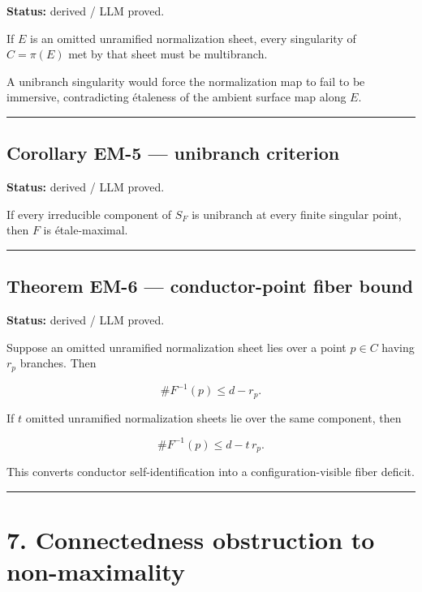 \textbf{Status:} derived / LLM proved.

If \(E\) is an omitted unramified normalization sheet, every singularity
of \(C=\pi(E)\) met by that sheet must be multibranch.

A unibranch singularity would force the normalization map to fail to be
immersive, contradicting étaleness of the ambient surface map along
\(E\).

\begin{center}\rule{0.5\linewidth}{0.5pt}\end{center}

\subsection{Corollary EM-5 --- unibranch
criterion}\label{corollary-em-5-unibranch-criterion}

\textbf{Status:} derived / LLM proved.

If every irreducible component of \(S_F\) is unibranch at every finite
singular point, then \(F\) is étale-maximal.

\begin{center}\rule{0.5\linewidth}{0.5pt}\end{center}

\subsection{Theorem EM-6 --- conductor-point fiber
bound}\label{theorem-em-6-conductor-point-fiber-bound}

\textbf{Status:} derived / LLM proved.

Suppose an omitted unramified normalization sheet lies over a point
\(p\in C\) having \(r_p\) branches. Then

\[
\#F^{-1}(p)\le d-r_p.
\]

If \(t\) omitted unramified normalization sheets lie over the same
component, then

\[
\#F^{-1}(p)\le d-t\,r_p.
\]

This converts conductor self-identification into a configuration-visible
fiber deficit.

\begin{center}\rule{0.5\linewidth}{0.5pt}\end{center}

\section{7. Connectedness obstruction to
non-maximality}\label{connectedness-obstruction-to-non-maximality}

